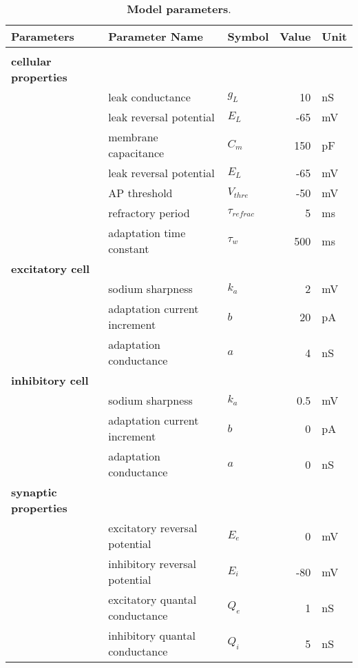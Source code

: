 \documentclass[8pt, colorlinks, a4paper]{article}
\begin{document}
\begin{table*}[tb!]
  \caption{\label{table:params}\textbf{Model parameters}.}
  \centering
  \begin{tabular}{l|l|l|r|l}
    \textbf{Parameters} & Parameter Name & Symbol & Value & Unit\\
    \hline
                        &  &  &  & \\
    \textbf{cellular properties} &  &  &  & \\
                        & leak conductance & \(g_L\) & 10 & nS\\
                        & leak reversal potential & \(E_L\) & -65 & mV\\
                        & membrane capacitance & \(C_m\) & 150 & pF\\
                        & leak reversal potential & \(E_L\) & -65 & mV\\
                        & AP threshold & \(V_{thre}\) & -50 & mV\\
                        & refractory period & \(\tau_{refrac}\) & 5 & ms\\
                        & adaptation time constant & \(\tau_w\) & 500 & ms\\
    \textbf{excitatory cell} &  &  &  & \\
                        & sodium sharpness & \(k_a\) & 2 & mV\\
                        & adaptation current increment & \(b\) & 20 & pA\\
                        & adaptation conductance & \(a\) & 4 & nS\\
    \textbf{inhibitory cell} &  &  &  & \\
                        & sodium sharpness & \(k_a\) & 0.5 & mV\\
                        & adaptation current increment & \(b\) & 0 & pA\\
                        & adaptation conductance & \(a\) & 0 & nS\\
    \textbf{synaptic properties} &  &  &  & \\
                        & excitatory reversal potential & \(E_e\) & 0 & mV\\
                        & inhibitory reversal potential & \(E_i\) & -80 & mV\\
                        & excitatory quantal conductance & \(Q_e\) & 1 & nS\\
                        & inhibitory quantal conductance & \(Q_i\) & 5 & nS\\

\end{tabular}
\end{table*}
\end{document}
